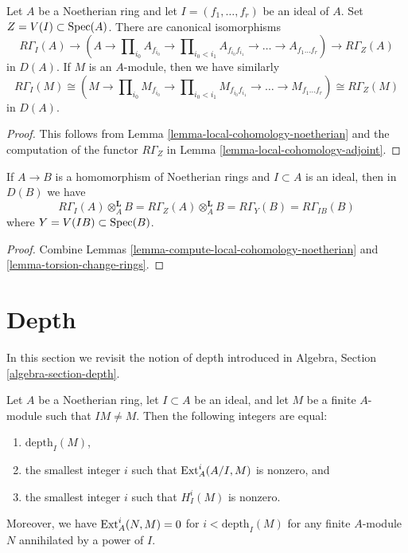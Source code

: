 \begin{lemma}
\label{lemma-compute-local-cohomology-noetherian}
Let $A$ be a Noetherian ring and let $I = (f_1, \ldots, f_r)$ be an ideal
of $A$. Set $Z = V(I) \subset \mathop{\mathrm{Spec}}(A)$. There are canonical isomorphisms
$$
R\Gamma_I(A) \to
(A \to \prod\nolimits_{i_0} A_{f_{i_0}} \to
\prod\nolimits_{i_0 < i_1} A_{f_{i_0}f_{i_1}} \to
\ldots \to A_{f_1\ldots f_r}) \to R\Gamma_Z(A)
$$
in $D(A)$. If $M$ is an $A$-module, then we have similarly
$$
R\Gamma_I(M) \cong
(M \to \prod\nolimits_{i_0} M_{f_{i_0}} \to
\prod\nolimits_{i_0 < i_1} M_{f_{i_0}f_{i_1}} \to
\ldots \to M_{f_1\ldots f_r}) \cong R\Gamma_Z(M)
$$
in $D(A)$.
\end{lemma}

\begin{proof}
This follows from Lemma \ref{lemma-local-cohomology-noetherian}
and the computation of the functor $R\Gamma_Z$ in
Lemma \ref{lemma-local-cohomology-adjoint}.
\end{proof}

\begin{lemma}
\label{lemma-local-cohomology-change-rings}
If $A \to B$ is a homomorphism of Noetherian rings and $I \subset A$
is an ideal, then in $D(B)$ we have
$$
R\Gamma_I(A) \otimes_A^\mathbf{L} B =
R\Gamma_Z(A) \otimes_A^\mathbf{L} B =
R\Gamma_Y(B) = R\Gamma_{IB}(B)
$$
where $Y = V(IB) \subset \mathop{\mathrm{Spec}}(B)$.
\end{lemma}

\begin{proof}
Combine Lemmas \ref{lemma-compute-local-cohomology-noetherian} and
\ref{lemma-torsion-change-rings}.
\end{proof}






\section{Depth}
\label{section-depth}

\noindent
In this section we revisit the notion of depth introduced in
Algebra, Section \ref{algebra-section-depth}.

\begin{lemma}
\label{lemma-depth}
Let $A$ be a Noetherian ring, let $I \subset A$ be an ideal, and
let $M$ be a finite $A$-module such that $IM \not = M$. Then
the following integers are equal:
\begin{enumerate}
\item $\text{depth}_I(M)$,
\item the smallest integer $i$ such that $\mathop{\mathrm{Ext}}\nolimits_A^i(A/I, M)$
is nonzero, and
\item the smallest integer $i$ such that $H^i_I(M)$ is nonzero.
\end{enumerate}
Moreover, we have $\mathop{\mathrm{Ext}}\nolimits^i_A(N, M) = 0$ for $i < \text{depth}_I(M)$
for any finite $A$-module $N$ annihilated by a power of $I$.
\end{lemma}

